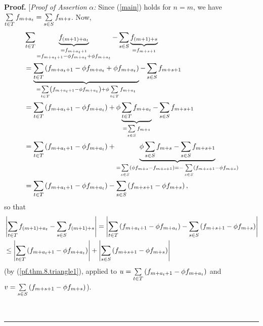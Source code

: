 \documentclass[numbers=enddot,12pt,final,onecolumn,notitlepage]{scrartcl}%
\numberwithin{exer}{section}
\theoremstyle{definition}
\newenvironment{proof}[1][Proof]{\noindent\textbf{#1.} }{\ \rule{0.5em}{0.5em}}
\let\sumnonlimits\sum
\renewcommand{\sum}{\sumnonlimits\limits}
\begin{document}
\begin{proof}
[\textit{Proof of Assertion }$\alpha$\textit{:} Since (\ref{main}) holds for
$n=m$, we have $\sum\limits_{t\in T}f_{m+a_{t}}=\sum\limits_{s\in S}f_{m+s}$.
Now,%
\begin{align*}
&  \sum\limits_{t\in T}\underbrace{f_{\left(  m+1\right)  +a_{t}}%
}_{\substack{=f_{m+a_{t}+1}\\=f_{m+a_{t}+1}-\phi f_{m+a_{t}}+\phi f_{m+a_{t}}%
}}-\sum\limits_{s\in S}\underbrace{f_{\left(  m+1\right)  +s}}_{=f_{m+s+1}}\\
&  =\underbrace{\sum\limits_{t\in T}\left(  f_{m+a_{t}+1}-\phi f_{m+a_{t}%
}+\phi f_{m+a_{t}}\right)  }_{=\sum\limits_{t\in T}\left(  f_{m+a_{t}+1}-\phi
f_{m+a_{t}}\right)  +\phi\sum\limits_{t\in T}f_{m+a_{t}}}-\sum\limits_{s\in
S}f_{m+s+1}\\
&  =\sum\limits_{t\in T}\left(  f_{m+a_{t}+1}-\phi f_{m+a_{t}}\right)
+\phi\underbrace{\sum\limits_{t\in T}f_{m+a_{t}}}_{=\sum\limits_{s\in
S}f_{m+s}}-\sum\limits_{s\in S}f_{m+s+1}\\
&  =\sum\limits_{t\in T}\left(  f_{m+a_{t}+1}-\phi f_{m+a_{t}}\right)
+\underbrace{\phi\sum\limits_{s\in S}f_{m+s}-\sum\limits_{s\in S}f_{m+s+1}%
}_{=\sum\limits_{s\in S}\left(  \phi f_{m+s}-f_{m+s+1}\right)  =-\sum
\limits_{s\in S}\left(  f_{m+s+1}-\phi f_{m+s}\right)  }\\
&  =\sum\limits_{t\in T}\left(  f_{m+a_{t}+1}-\phi f_{m+a_{t}}\right)
-\sum\limits_{s\in S}\left(  f_{m+s+1}-\phi f_{m+s}\right)  ,
\end{align*}
so that%
\begin{align}
&  \left\vert \sum\limits_{t\in T}f_{\left(  m+1\right)  +a_{t}}%
-\sum\limits_{s\in S}f_{\left(  m+1\right)  +s}\right\vert =\left\vert
\sum\limits_{t\in T}\left(  f_{m+a_{t}+1}-\phi f_{m+a_{t}}\right)
-\sum\limits_{s\in S}\left(  f_{m+s+1}-\phi f_{m+s}\right)  \right\vert
\nonumber\\
&  \leq\left\vert \sum\limits_{t\in T}\left(  f_{m+a_{t}+1}-\phi f_{m+a_{t}%
}\right)  \right\vert +\left\vert \sum\limits_{s\in S}\left(  f_{m+s+1}-\phi
f_{m+s}\right)  \right\vert \label{Estimate1}%
\end{align}
(by (\ref{pf.thm.8.triangle1}), applied to $u = \sum\limits_{t\in T}\left(
f_{m+a_{t}+1}-\phi f_{m+a_{t}}\right)  $ and $v = \sum\limits_{s\in S}\left(
f_{m+s+1}-\phi f_{m+s}\right)  $).


\end{proof}
\end{document}
